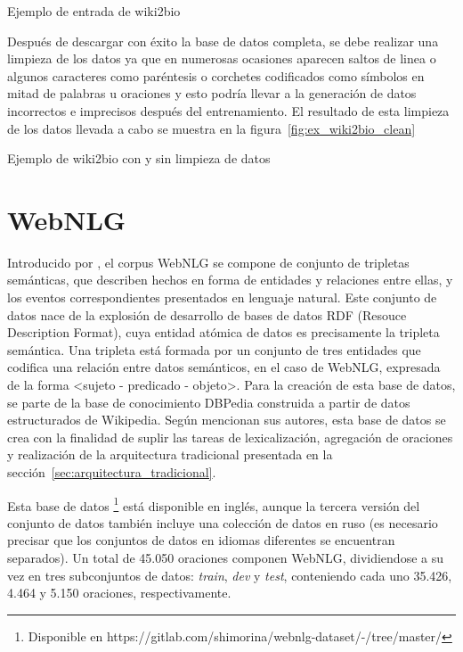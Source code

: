 %
{Ejemplo de entrada de wiki2bio}


Después de descargar con éxito la base de datos completa, se debe realizar una limpieza de los datos ya que en numerosas ocasiones aparecen saltos de linea o algunos caracteres como paréntesis o corchetes codificados como símbolos en mitad de palabras u oraciones y esto podría llevar a la generación de datos incorrectos e imprecisos después del entrenamiento. El resultado de esta limpieza de los datos llevada a cabo se muestra en la figura~\ref{fig:ex_wiki2bio_clean}


%
{Ejemplo de wiki2bio con y sin limpieza de datos}



\section{WebNLG}
Introducido por \citep{gardent2017creating}, el corpus WebNLG se compone de conjunto de tripletas semánticas, que describen hechos en forma de entidades y relaciones entre ellas, y los eventos correspondientes presentados en lenguaje natural. Este conjunto de datos nace de la explosión de desarrollo de bases de datos RDF (Resouce Description Format), cuya entidad atómica de datos es precisamente la tripleta semántica. Una tripleta está formada por un conjunto de tres entidades que codifica una relación entre datos semánticos, en el caso de WebNLG, expresada de la forma <sujeto - predicado - objeto>. Para la creación de esta base de datos, se parte de la base de conocimiento DBPedia construida a partir de datos estructurados de Wikipedia. Según mencionan sus autores, esta base de datos se crea con la finalidad de suplir las tareas de lexicalización, agregación de oraciones y realización de la arquitectura tradicional presentada en la sección~\ref{sec:arquitectura_tradicional}.

Esta base de datos \footnote{Disponible en https://gitlab.com/shimorina/webnlg-dataset/-/tree/master/} está disponible en inglés, aunque la tercera versión del conjunto de datos también incluye una colección de datos en ruso (es necesario precisar que los conjuntos de datos en idiomas diferentes se encuentran separados). Un total de 45.050 oraciones componen WebNLG, dividiendose a su vez en tres subconjuntos de datos: \textit{train}, \textit{dev}  y \textit{test}, conteniendo cada uno 35.426, 4.464 y 5.150 oraciones, respectivamente. 

